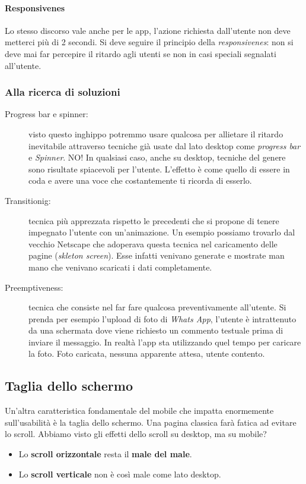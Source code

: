 			\paragraph{Responsivenes}
				Lo stesso discorso vale anche per le app, l'azione richiesta dall'utente non deve metterci più di 2 secondi. Si deve seguire il principio della \emph{responsivenes}: non si deve mai far percepire il ritardo agli utenti se non in casi speciali segnalati all'utente.
				
			\subsubsection{Alla ricerca di soluzioni}
				\begin{description}
					\item[Progress bar e spinner:] visto questo inghippo potremmo usare qualcosa per allietare il ritardo inevitabile attraverso tecniche già usate dal lato desktop come \emph{progress bar} e \emph{Spinner}. NO! In qualsiasi caso, anche su desktop, tecniche del genere sono risultate spiacevoli per l'utente. L'effetto è come quello di essere in coda e avere una voce che costantemente ti ricorda di esserlo.
					\item[Transitionig:] tecnica più apprezzata rispetto le precedenti che si propone di tenere impegnato l'utente con un'animazione. Un esempio possiamo trovarlo dal vecchio Netscape che adoperava questa tecnica nel caricamento delle pagine (\emph{skleton screen}). Esse infatti venivano generate e mostrate man mano che venivano scaricati i dati completamente.
					\item[Preemptiveness:] tecnica che consiste nel far fare qualcosa preventivamente all'utente. Si prenda per esempio l'upload di foto di \emph{Whats App}, l'utente è intrattenuto da una schermata dove viene richiesto un commento testuale prima di inviare il messaggio. In realtà l'app sta utilizzando quel tempo per caricare la foto. Foto caricata, nessuna apparente attesa, utente contento.
				\end{description}
				
		\subsection{Taglia dello schermo}
			Un'altra caratteristica fondamentale del mobile che impatta enormemente sull'usabilità è la taglia dello schermo. Una pagina classica farà fatica ad evitare lo scroll. Abbiamo visto gli effetti dello scroll su desktop, ma su mobile?
			\begin{itemize}
				\item Lo \textbf{scroll orizzontale} resta il \textbf{male del male}.
				\item Lo \textbf{scroll verticale} non è così male come lato desktop.
			\end{itemize}
			
